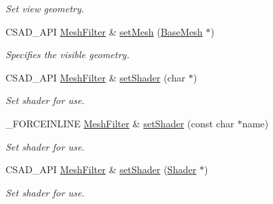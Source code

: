 \begin{DoxyCompactItemize}
\begin{DoxyCompactList}\small\item\em Set view geometry. \end{DoxyCompactList}\item 
\hypertarget{classcsad_1_1_mesh_filter_ac930a7e52f86a271f711efe943c1471b}{C\-S\-A\-D\-\_\-\-A\-P\-I \hyperlink{classcsad_1_1_mesh_filter}{Mesh\-Filter} \& \hyperlink{classcsad_1_1_mesh_filter_ac930a7e52f86a271f711efe943c1471b}{set\-Mesh} (\hyperlink{classcsad_1_1_base_mesh}{Base\-Mesh} $\ast$)}\label{classcsad_1_1_mesh_filter_ac930a7e52f86a271f711efe943c1471b}

\begin{DoxyCompactList}\small\item\em Specifies the visible geometry. \end{DoxyCompactList}\item 
\hypertarget{classcsad_1_1_mesh_filter_a0b7827a2ea54e3d36b219d4f978c917c}{C\-S\-A\-D\-\_\-\-A\-P\-I \hyperlink{classcsad_1_1_mesh_filter}{Mesh\-Filter} \& \hyperlink{classcsad_1_1_mesh_filter_a0b7827a2ea54e3d36b219d4f978c917c}{set\-Shader} (char $\ast$)}\label{classcsad_1_1_mesh_filter_a0b7827a2ea54e3d36b219d4f978c917c}

\begin{DoxyCompactList}\small\item\em Set shader for use. \end{DoxyCompactList}\item 
\hypertarget{classcsad_1_1_mesh_filter_af961ebe8b8bb7d13538f6e6b3f8e9608}{\-\_\-\-F\-O\-R\-C\-E\-I\-N\-L\-I\-N\-E \hyperlink{classcsad_1_1_mesh_filter}{Mesh\-Filter} \& \hyperlink{classcsad_1_1_mesh_filter_af961ebe8b8bb7d13538f6e6b3f8e9608}{set\-Shader} (const char $\ast$name)}\label{classcsad_1_1_mesh_filter_af961ebe8b8bb7d13538f6e6b3f8e9608}

\begin{DoxyCompactList}\small\item\em Set shader for use. \end{DoxyCompactList}\item 
\hypertarget{classcsad_1_1_mesh_filter_a67a062e40e51c5f5528fff391d011c0b}{C\-S\-A\-D\-\_\-\-A\-P\-I \hyperlink{classcsad_1_1_mesh_filter}{Mesh\-Filter} \& \hyperlink{classcsad_1_1_mesh_filter_a67a062e40e51c5f5528fff391d011c0b}{set\-Shader} (\hyperlink{classcsad_1_1_shader}{Shader} $\ast$)}\label{classcsad_1_1_mesh_filter_a67a062e40e51c5f5528fff391d011c0b}

\begin{DoxyCompactList}\small\item\em Set shader for use. \end{DoxyCompactList}\end{DoxyCompactItemize}
